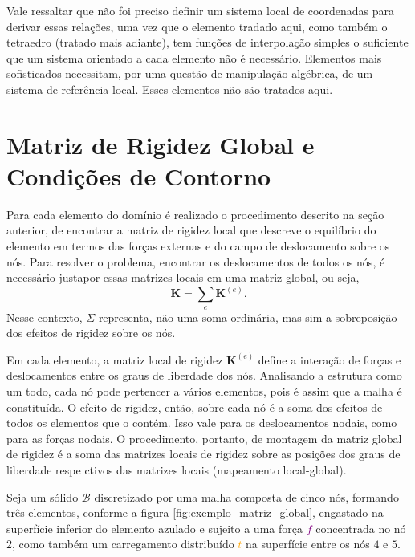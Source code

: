 Vale ressaltar que não foi preciso definir um sistema local de coordenadas para derivar essas relações, uma vez que o elemento tradado aqui, como também o tetraedro (tratado mais adiante), tem funções de interpolação simples o suficiente que um sistema orientado a cada elemento não é necessário. Elementos mais sofisticados necessitam, por uma questão de manipulação algébrica, de um sistema de referência local. Esses elementos não são tratados aqui.

\section{Matriz de Rigidez Global e Condições de Contorno}

Para cada elemento do domínio é realizado o procedimento descrito na seção anterior, de encontrar a matriz de rigidez local que descreve o equilíbrio do elemento em termos das forças externas e do campo de deslocamento sobre os nós. Para resolver o problema, encontrar os deslocamentos de todos os nós, é necessário justapor essas matrizes locais em uma matriz global, ou seja,
\begin{equation}
    \bm{K} = \sum_{e} \bm{K}^{(e)}.
\end{equation}
Nesse contexto, $\Sigma$ representa, não uma soma ordinária, mas sim a sobreposição dos efeitos de rigidez sobre os nós. \cite{LOGAN}

Em cada elemento, a matriz local de rigidez $\bm{K}^{(e)}$ define a interação de forças e deslocamentos entre os graus de liberdade dos nós. Analisando a estrutura como um todo, cada nó pode pertencer a vários elementos, pois é assim que a malha é constituída. O efeito de rigidez, então, sobre cada nó é a soma dos efeitos de todos os elementos que o contém. Isso vale para os deslocamentos nodais, como para as forças nodais. O procedimento, portanto, de montagem da matriz global de rigidez é a soma das matrizes locais de rigidez sobre as posições dos graus de liberdade respe    ctivos das matrizes locais (mapeamento local-global).



Seja um sólido $\mathcal{B}$ discretizado por uma malha composta de cinco nós, formando três elementos, conforme a figura \ref{fig:exemplo_matriz_global}, engastado na superfície inferior do elemento azulado e sujeito a uma força \textcolor{purple}{$f$} concentrada no nó $2$, como também um carregamento distribuído \textcolor{orange}{$t$} na superfície entre os nós $4$ e $5$.

